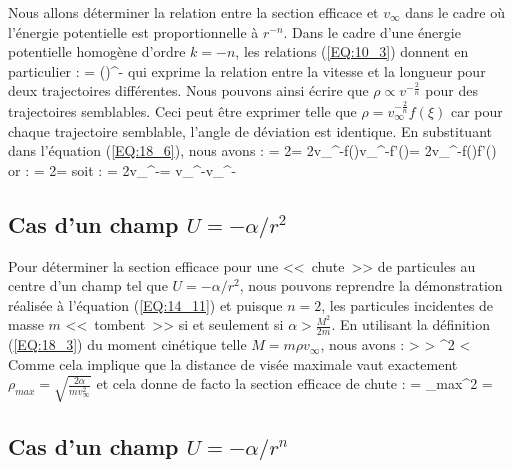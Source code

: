Nous allons d\'eterminer la relation entre la section efficace et $v_{\infty}$ dans le cadre o\`u l'\'energie potentielle est proportionnelle \`a $r^{-n}$. Dans le cadre d'une \'energie potentielle homog\`ene d'ordre $k = -n$, les relations (\ref{EQ:10_3}) donnent en particulier :
\be
	 = \left(\right)^{-}
\ee
qui exprime la relation entre la vitesse et la longueur pour deux trajectoires diff\'erentes. Nous pouvons ainsi \'ecrire que $\rho\propto v^{-\frac{2}{n}}$ pour des trajectoires semblables. Ceci peut \^etre exprimer telle que $\rho = v_{\infty}^{-\frac{2}{n}}f(\xi)$ car pour chaque trajectoire semblable, l'angle de d\'eviation est identique. En substituant dans l'\'equation (\ref{EQ:18_6}), nous avons :
\be
	\sigma = 2\pi\rho{}\rho = 2\pi v_{\infty}^{-}f(\xi)\cdot v_{\infty}^{-}f'(\xi)\xi = 2\pi v_{\infty}^{-}f(\xi)f'(\xi)\xi
\ee
or :
\be
	\omega = 2\pi\sin\xi{}\xi \Rightarrow {}\xi = 
\ee
soit :
\be
	\sigma = 2\pi v_{\infty}^{-}\omega = v_{\infty}^{-}\omega \propto v_{\infty}^{-}\omega
\ee

\subsection{Cas d'un champ $U = -\alpha / r^{2}$}

Pour d\'eterminer la section efficace pour une <<~chute~>> de particules au centre d'un champ tel que $U = -\alpha / r^{2}$, nous pouvons reprendre la d\'emonstration r\'ealis\'ee à l'\'equation (\ref{EQ:14_11}) et puisque $n = 2$, les particules incidentes de masse $m$ <<~tombent~>> si et seulement si $\alpha > \frac{M^{2}}{2m}$. En utilisant la d\'efinition (\ref{EQ:18_3}) du moment cin\'etique telle $M = m\rho v_{\infty}$, nous avons :
\be
	\alpha >  \Leftrightarrow \alpha >  \Leftrightarrow \rho^{2} < 
\ee
Comme cela implique que la distance de vis\'ee maximale vaut exactement $\rho_{max} = \sqrt{\frac{2\alpha}{mv_{\infty}^{2}}}$ et cela donne de facto la section efficace de chute :
\be
	\sigma = \pi\rho_{max}^{2} = 
\ee

\subsection{Cas d'un champ $U = -\alpha / r^{n}$}

